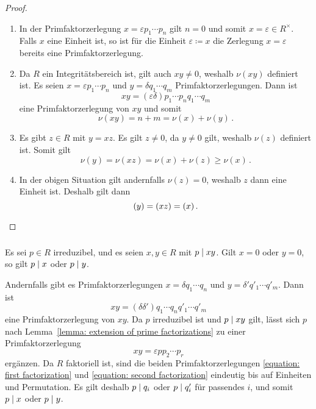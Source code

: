 \begin{proof}\leavevmode
  \begin{enumerate}
    \item
      In der Primfaktorzerlegung $x = \varepsilon p_1 \dotsm p_n$ gilt $n = 0$ und somit $x = \varepsilon \in R^\times$.
      Falls $x$ eine Einheit ist, so ist für die Einheit $\varepsilon \coloneqq x$ die Zerlegung $x = \varepsilon$ bereits eine Primfaktorzerlegung.
    \item
      Da $R$ ein Integritätsbereich ist, gilt auch $xy \neq 0$, weshalb $\nu(xy)$ definiert ist.
      Es seien $x = \varepsilon p_1 \dotsm p_n$ und $y = \delta q_1 \dotsm q_m$ Primfaktorzerlegungen.
      Dann ist
      \[
          xy
        = (\varepsilon \delta) p_1 \dotsm p_n q_1 \dotsm q_m
      \]
      eine Primfaktorzerlegung von $xy$ und somit
      \[
          \nu(xy)
        = n + m
        = \nu(x) + \nu(y) \,.
      \]
    \item
     Es gibt $z \in R$ mit $y = xz$.
     Es gilt $z \neq 0$, da $y \neq 0$ gilt, weshalb $\nu(z)$ definiert ist.
     Somit gilt
     \[
            \nu(y)
       =    \nu(xz)
       =    \nu(x) + \nu(z)
       \geq \nu(x) \,.
     \]
    \item
      In der obigen Situation gilt andernfalls $\nu(z) = 0$, weshalb $z$ dann eine Einheit ist.
      Deshalb gilt dann
      \[
          (y)
        = (xz)
        = (x) \,.
        \qedhere
      \]
  \end{enumerate}
\end{proof}



\subsubsection{}

Es sei $p \in R$ irreduzibel, und es seien $x, y \in R$ mit $p \mathrel{|} xy$.
Gilt $x = 0$ oder $y = 0$, so gilt $p \mathrel{|} x$ oder $p \mathrel{|} y$.

Andernfalls gibt es Primfaktorzerlegungen $x = \delta q_1 \dotsm q_n$ und $y = \delta' q'_1 \dotsm q'_m$.
Dann ist
\begin{equation}
  \label{equation: first factorization}
    xy
  = (\delta \delta') q_1 \dotsm q_n q'_1 \dotsm q'_m
\end{equation}
eine Primfaktorzerlegung von $xy$.
Da $p$ irreduzibel ist und $p \mathrel{|} xy$ gilt, lässt sich $p$ nach Lemma~\ref{lemma: extension of prime factorizations} zu einer Primfaktorzerlegung
\begin{equation}
  \label{equation: second factorization}
    xy
  = \varepsilon p p_2 \dotsm p_r
\end{equation}
ergänzen.
Da $R$ faktoriell ist, sind die beiden Primfaktorzerlegungen \eqref{equation: first factorization} und \eqref{equation: second factorization} eindeutig bis auf Einheiten und Permutation.
Es gilt deshalb $p \mathrel{|} q_i$ oder $p \mathrel{|} q'_i$ für passendes $i$, und somit $p \mathrel{|} x$ oder $p \mathrel{|} y$.



